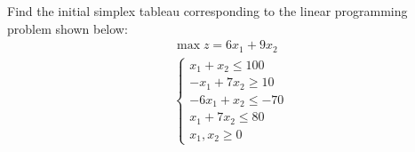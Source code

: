 \documentclass[11pt,letterpaper]{article}
\begin{document}

 Find the initial simplex tableau corresponding to the linear programming problem shown below:
	\[
	\begin{gathered}
	\max z= 6x_1 + 9 x_2 \\
	\begin{cases}
	x_1 + x_2 \leq 100 \\
	-x_1 + 7x_2 \geq 10 \\
	-6x_1 + x_2 \leq -70 \\
	x_1 + 7x_2 \leq 80 \\
	x_1, x_2 \geq 0
	\end{cases}
	\end{gathered}
	\] \pspace
\end{document}
